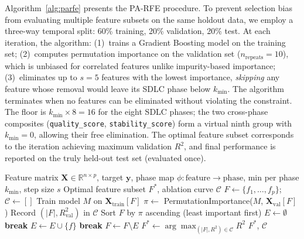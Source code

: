 \documentclass[technologies,article,submit,pdftex,moreauthors]{Definitions/mdpi}
\begin{document}
Algorithm~\ref{alg:parfe} presents the PA-RFE
procedure. To prevent selection bias from evaluating multiple feature
subsets on the same holdout data, we employ a three-way temporal split:
60\% training, 20\% validation, 20\% test. At each iteration, the
algorithm: (1)~trains a Gradient Boosting model on the training set;
(2)~computes permutation importance on the validation set
(\(n_{\text{repeats}} = 10\)), which is unbiased for correlated features
unlike impurity-based importance; (3)~eliminates up to \(s = 5\)
features with the lowest importance, \emph{skipping} any feature whose
removal would leave its SDLC phase below \(k_{\min}\). The algorithm
terminates when no features can be eliminated without violating the
constraint. The floor is \(k_{\min} \times 8 = 16\) for the eight SDLC
phases; the two cross-phase composites (\texttt{quality\_score},
\texttt{stability\_score}) form a virtual ninth group with
\(k_{\min} = 0\), allowing their free elimination. The optimal feature
subset corresponds to the iteration achieving maximum validation
\(R^2\), and final performance is reported on the truly held-out test
set (evaluated once).

\begin{algorithm}[H]
\caption{Phase-Aware Recursive Feature Elimination (PA-RFE)}\label{alg:parfe}
\begin{algorithmic}[1]
\Require Feature matrix $\mathbf{X} \in \mathbb{R}^{n \times p}$, target $\mathbf{y}$, phase map $\phi: \text{feature} \rightarrow \text{phase}$, min per phase $k_{\min}$, step size $s$
\Ensure Optimal feature subset $F^*$, ablation curve $\mathcal{C}$
\State $F \leftarrow \{f_1, \ldots, f_p\}$; $\mathcal{C} \leftarrow []$
    \State Train model $M$ on $\mathbf{X}_{\text{train}}[F]$
    \State $\pi \leftarrow$ PermutationImportance($M$, $\mathbf{X}_{\text{val}}[F]$)
    \State Record $(|F|, R^2_{\text{val}})$ in $\mathcal{C}$
    \State Sort $F$ by $\pi$ ascending (least important first)
    \State $E \leftarrow \emptyset$ 
            \State \textbf{break}
        \EndIf
            \State $E \leftarrow E \cup \{f\}$
        \EndIf
    \EndFor
        \State \textbf{break} 
    \EndIf
    \State $F \leftarrow F \setminus E$
\EndWhile
\State $F^* \leftarrow \arg\max_{(|F|, R^2) \in \mathcal{C}} R^2$
\State \Return $F^*$, $\mathcal{C}$
\end{algorithmic}
\end{algorithm}
\end{document}
